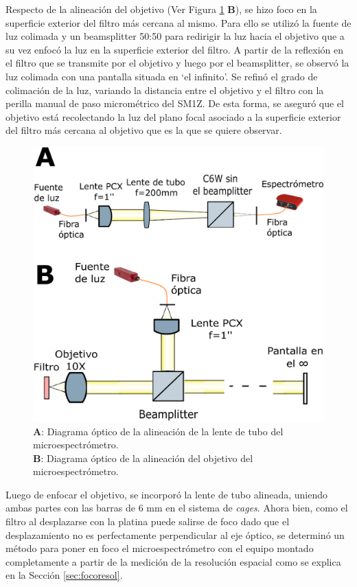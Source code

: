 Respecto de la alineación del objetivo (Ver Figura \ref{fig:ali} \textbf{B}), se hizo foco en la superficie exterior del filtro más cercana al mismo. Para ello se utilizó la fuente de luz colimada y un beamsplitter 50:50 para redirigir la luz hacia el objetivo que a su vez enfocó la luz en la superficie exterior del filtro. A partir de la reflexión en el filtro que se transmite por el objetivo y luego por el beamsplitter, se observó la luz colimada con una pantalla situada en `el infinito'.  Se refinó el grado de colimación de la luz, variando la distancia entre el objetivo y el filtro con la perilla manual de paso micrométrico del SM1Z. De esta forma, se aseguró que el objetivo está recolectando la luz del plano focal asociado a la superficie exterior del filtro más cercana al objetivo que es la que se quiere observar. 

\begin{figure}[H]
\centering
\includegraphics[scale=0.21]{Figs/microespectrometro/alitublnobj.png}
\caption{\textbf{A}: Diagrama óptico de la alineación de la lente de tubo del microespectrómetro. \\ \textbf{B}: Diagrama óptico de la alineación del objetivo del microespectrómetro.}
\label{fig:ali}
\end{figure}

Luego de enfocar el objetivo, se incorporó la lente de tubo alineada, uniendo ambas partes con las barras de 6 mm en el sistema de \textit{cages}. Ahora bien, como el filtro al desplazarse con la platina puede salirse de foco dado que el desplazamiento no es perfectamente perpendicular al eje óptico, se determinó un método para poner en foco el microespectrómetro con el equipo montado completamente a partir de la medición de la resolución espacial como se explica en la Sección \ref{sec:focoresol}.

